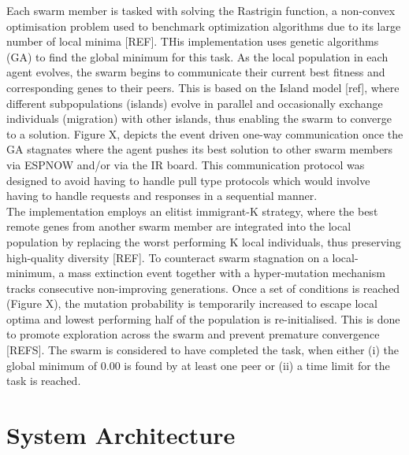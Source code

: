 \documentclass[conference]{IEEEtran}
\begin{document}
Each swarm member is tasked with solving the Rastrigin function, a non-convex optimisation problem used to benchmark optimization algorithms due to its large number of local minima [REF]. THis implementation uses genetic algorithms (GA) to find the global minimum for this task. As the local population in each agent evolves, the swarm begins to communicate their current best fitness and corresponding genes to their peers. This is based on the Island model [ref], where different subpopulations (islands) evolve in parallel and occasionally exchange individuals (migration) with other islands, thus enabling the swarm to converge to a solution. Figure X, depicts the event driven one-way communication once the GA stagnates where the agent pushes its best solution to other swarm members via ESPNOW and/or via the IR board. This communication protocol was designed to avoid having to handle pull type protocols which would involve having to handle requests and responses in a sequential manner.\\  

The implementation employs an elitist immigrant-K strategy, where the best remote genes from another swarm member are integrated into the local population by replacing the worst performing K local individuals, thus preserving high-quality diversity [REF]. To counteract swarm stagnation on a local-minimum, a mass extinction event together with a hyper-mutation mechanism tracks consecutive non-improving generations. Once a set of conditions is reached (Figure X), the mutation probability is temporarily increased to escape local optima and lowest performing half of the population is re-initialised. This is done to promote exploration across the swarm and prevent premature convergence [REFS]. The swarm is considered to have completed the task, when either (i) the global minimum of 0.00 is found by at least one peer or (ii) a time limit for the task is reached.


\section{System Architecture}
\end{document}
